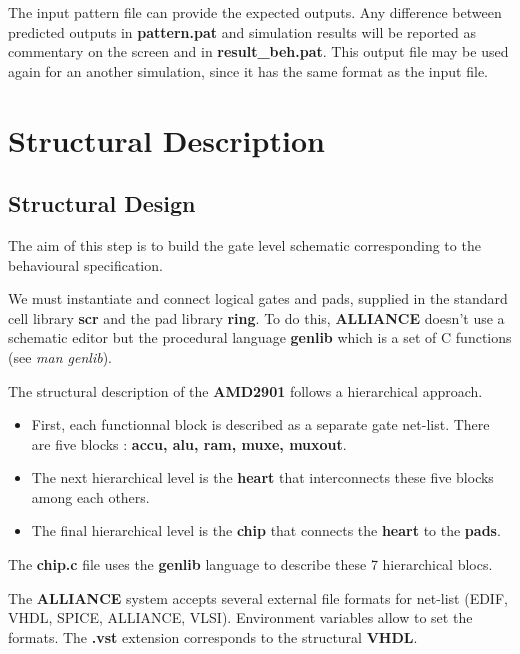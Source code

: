 \documentclass[11pt,a4]{article}
\begin{document}
The input pattern file can provide the expected outputs.
Any difference between predicted outputs in {\bf pattern.pat} and simulation 
results will be reported as commentary
on the screen and in {\bf result\_beh.pat}. This output file may be used again
for an another simulation, since it has the same format as the input file.

\section{Structural Description}

\subsection{Structural Design}

The aim of this step is to build the gate level schematic 
corresponding to the behavioural specification.

We must instantiate and connect logical gates and pads,
supplied in the standard cell library {\bf scr} and the pad 
library {\bf ring}. 
To do this, {\bf ALLIANCE} doesn't use a schematic editor
but the procedural language {\bf genlib}
which is a set of C functions (see {\it man genlib}).

The structural description of the {\bf AMD2901} follows a hierarchical
approach.

\begin{itemize}
\item First, each functionnal block is described as a separate gate net-list.
There are five blocks : {\bf accu, alu, ram, muxe, muxout}.
\item The next hierarchical level is the {\bf heart} 
that interconnects these five blocks among each others.
\item The final hierarchical level is the {\bf chip}
that connects the {\bf heart} to the {\bf pads}.
\end {itemize}

The {\bf chip.c} file uses the {\bf genlib} language to describe
these 7 hierarchical blocs.

The {\bf ALLIANCE} system accepts several external file formats for net-list
(EDIF, VHDL, SPICE, ALLIANCE, VLSI).
Environment variables allow to set the formats.
The {\bf .vst} extension corresponds to the structural {\bf VHDL}.\\
\\
\end{document}
